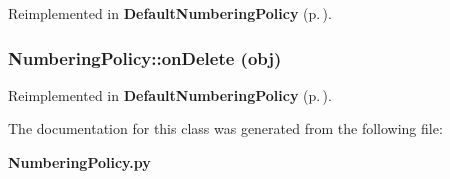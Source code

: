 Reimplemented in {\bf Default\-Numbering\-Policy} {\rm (p.\,\pageref{classDefaultNumberingPolicy_DefaultNumberingPolicya1})}.
\subsubsection{\setlength{\rightskip}{0pt plus 5cm}Numbering\-Policy::on\-Delete (obj)}\label{classNumberingPolicy_NumberingPolicya2}




Reimplemented in {\bf Default\-Numbering\-Policy} {\rm (p.\,\pageref{classDefaultNumberingPolicy_DefaultNumberingPolicya2})}.

The documentation for this class was generated from the following file:\begin{CompactItemize}
\item 
{\bf Numbering\-Policy.py}\end{CompactItemize}
